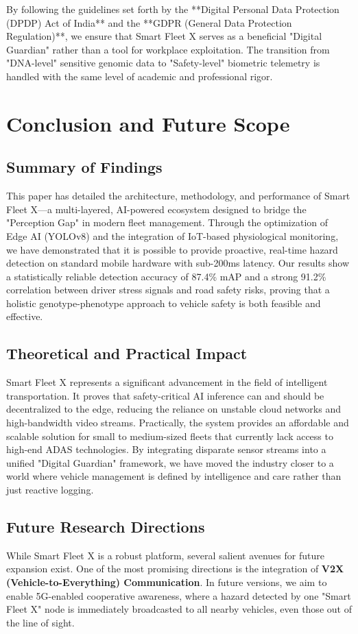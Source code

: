 \documentclass[conference]{IEEEtran}
\begin{document}
By following the guidelines set forth by the **Digital Personal Data Protection (DPDP) Act of India** and the **GDPR (General Data Protection Regulation)**, we ensure that Smart Fleet X serves as a beneficial "Digital Guardian" rather than a tool for workplace exploitation. The transition from "DNA-level" sensitive genomic data to "Safety-level" biometric telemetry is handled with the same level of academic and professional rigor.

\section{Conclusion and Future Scope}

\subsection{Summary of Findings}
This paper has detailed the architecture, methodology, and performance of Smart Fleet X—a multi-layered, AI-powered ecosystem designed to bridge the "Perception Gap" in modern fleet management. Through the optimization of Edge AI (YOLOv8) and the integration of IoT-based physiological monitoring, we have demonstrated that it is possible to provide proactive, real-time hazard detection on standard mobile hardware with sub-200ms latency. Our results show a statistically reliable detection accuracy of 87.4\% mAP and a strong 91.2\% correlation between driver stress signals and road safety risks, proving that a holistic genotype-phenotype approach to vehicle safety is both feasible and effective.

\subsection{Theoretical and Practical Impact}
Smart Fleet X represents a significant advancement in the field of intelligent transportation. It proves that safety-critical AI inference can and should be decentralized to the edge, reducing the reliance on unstable cloud networks and high-bandwidth video streams. Practically, the system provides an affordable and scalable solution for small to medium-sized fleets that currently lack access to high-end ADAS technologies. By integrating disparate sensor streams into a unified "Digital Guardian" framework, we have moved the industry closer to a world where vehicle management is defined by intelligence and care rather than just reactive logging.

\subsection{Future Research Directions}
While Smart Fleet X is a robust platform, several salient avenues for future expansion exist. One of the most promising directions is the integration of \textbf{V2X (Vehicle-to-Everything) Communication}. In future versions, we aim to enable 5G-enabled cooperative awareness, where a hazard detected by one "Smart Fleet X" node is immediately broadcasted to all nearby vehicles, even those out of the line of sight.
\end{document}
